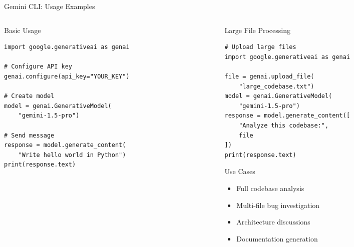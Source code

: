 \documentclass[aspectratio=169,11pt]{beamer}
\begin{document}
\begin{frame}[fragile]{Gemini CLI: Usage Examples}
    \begin{columns}[T]
        \begin{column}{0.5\textwidth}
            \begin{block}{Basic Usage}
                \begin{lstlisting}[style=python]
import google.generativeai as genai

# Configure API key
genai.configure(api_key="YOUR_KEY")

# Create model
model = genai.GenerativeModel(
    "gemini-1.5-pro")

# Send message
response = model.generate_content(
    "Write hello world in Python")
print(response.text)
                \end{lstlisting}
            \end{block}
        \end{column}
        \begin{column}{0.5\textwidth}
            \begin{block}{Large File Processing}
                \begin{lstlisting}[style=python]
# Upload large files
import google.generativeai as genai

file = genai.upload_file(
    "large_codebase.txt")
model = genai.GenerativeModel(
    "gemini-1.5-pro")
response = model.generate_content([
    "Analyze this codebase:",
    file
])
print(response.text)
                \end{lstlisting}
            \end{block}

            \begin{exampleblock}{Use Cases}
                \begin{itemize}
                    \item Full codebase analysis
                    \item Multi-file bug investigation
                    \item Architecture discussions
                    \item Documentation generation
                \end{itemize}
            \end{exampleblock}
        \end{column}
    \end{columns}

\end{frame}
\end{document}
